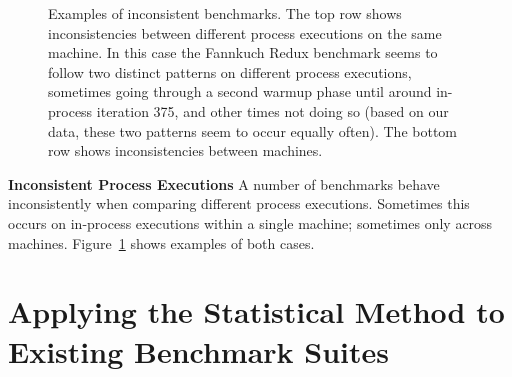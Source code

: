 \documentclass[preprint,numbers,10pt]{sigplanconf}
\begin{document}
\begin{figure}[t!]
\makebox[\textwidth][c]{~}  %
\caption{Examples of inconsistent benchmarks.
The top row shows inconsistencies between different process
executions on the same machine. In this case the Fannkuch Redux benchmark
seems to follow two distinct patterns on different process executions,
sometimes going through a second warmup phase until around in-process iteration 375, and
other times not doing so (based on our data, these two patterns seem to occur
equally often). The bottom row shows inconsistencies between
machines.}
\label{fig:examples:inconsistent}
\end{figure}

\textbf{Inconsistent Process Executions} \label{sub:inconsistent}
A number of benchmarks behave inconsistently when comparing different process executions. Sometimes this occurs on
in-process executions within a single machine; sometimes only across machines.
Figure~\ref{fig:examples:inconsistent} shows examples of both cases.


\section{Applying the Statistical Method to Existing Benchmark Suites}
\end{document}
